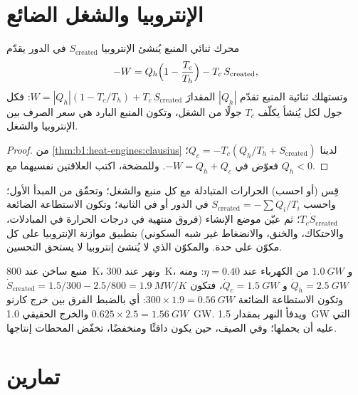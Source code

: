 \section{الإنتروبيا والشغل الضائع}

\begin{theorem}\label{thm:b1:heat-engines:lostwork}
محرك ثنائي المنبع يُنشئ الإنتروبيا $S_{\mathrm{created}}$ في الدور
يقدّم
\[
-W = Q_h\Bigl(1 - \frac{T_c}{T_h}\Bigr) - T_c\,S_{\mathrm{created}} ,
\]
وتستهلك  ثنائية المنبع تقدّم $|Q_h|$ المقدارَ
$W = |Q_h|(1 - T_c/T_h) + T_c\,S_{\mathrm{created}}$: فكل جول لكل 
يُنشأ يكلّف $T_c$ جولًا من الشغل، وتكون  المنبع البارد
هي سعر الصرف بين الإنتروبيا والشغل.
\end{theorem}

\begin{proof}
من \cref{thm:b1:heat-engines:clausius} لدينا $Q_c = -T_c(Q_h/T_h + S_{\mathrm{created}})$؛
فعوّض في $-W = Q_h + Q_c$. وللمضخة، اكتب العلاقتين نفسيهما
مع $Q_h < 0$.
\end{proof}

\begin{method}\label{meth:b1:heat-engines:audit}
قِس (أو احسب) الحرارات المتبادلة مع كل منبع والشغل؛
وتحقّق من المبدأ الأول؛ واحسب $S_{\mathrm{created}} = -\sum Q_i/T_i$ في الدور
أو في الثانية؛ وتكون الاستطاعة الضائعة $T_c\dot S_{\mathrm{created}}$؛ ثم عيّن موضع
الإنشاء (فروق منتهية في درجات الحرارة في المبادلات، والاحتكاك، والخنق،
والانضغاط غير شبه السكوني) بتطبيق موازنة الإنتروبيا على كل
مكوّن على حدة. والمكوّن الذي لا يُنشئ إنتروبيا لا يستحق
التحسين.
\end{method}

\begin{example}\label{ex:b1:heat-engines:audit}
منبع ساخن عند \qty{800}{K}، ونهر عند \qty{300}{K}، و $\qty{1.0}{GW}$ من الكهرباء
عند $\eta = 0.40$: ومنه $\dot Q_h = \qty{2.5}{GW}$ و $\dot Q_c = \qty{1.5}{GW}$، فتكون
$\dot S_{\mathrm{created}} = 1.5/300 - 2.5/800 = \qty{1.9}{MW/K}$ وتكون الاستطاعة
الضائعة $300 \times 1.9 = \qty{0.56}{GW}$: أي بالضبط الفرق بين
خرج كارنو $0.625 \times 2.5 = \qty{1.56}{GW}$ والخرج الحقيقي \qty{1.0}{GW}.
ويدفأ النهر بمقدار \qty{1.5}{GW} التي عليه أن يحملها؛ وفي الصيف، حين
يكون دافئًا ومنخفضًا، تخفّض المحطات إنتاجها.
\end{example}

\section{تمارين}

